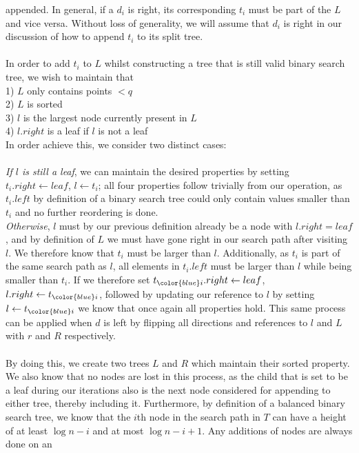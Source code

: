 \documentclass{article}
\newcommand{\fb}[1]{{\color{blue}#1}}
\begin{document}
appended. In general, if a $d_i$ is right, its corresponding $t_i$ must be part
of the $L$ and vice versa. Without loss of generality, we will assume that
$d_i$ is right in our discussion of how to append $t_i$ to its split tree. \\\\
In order to add $t_i$ to $L$ whilst constructing a tree that is still valid
binary search tree, we wish to maintain that \\ 1) $L$ only contains points $<
    q$ \\ 2) $L$ is sorted \\ 3) $l$ is the largest node currently present in $L$
\\ 4) $l.right$ is a leaf if $l$ is not a leaf \\ In order achieve this, we
consider two distinct cases: \\\\ \textit{If $l$ is still a leaf}, we can
maintain the desired properties by setting $t_i.right \leftarrow leaf$, $l
    \leftarrow t_i$; all four properties follow trivially from our operation, as
$t_i.left$ by definition of a binary search tree could only contain values
smaller than $t_i$ and no further reordering is done. \\ \textit{Otherwise},
$l$ must by our previous definition already be a node with $l.right = leaf$,
and by definition of $L$ we must have gone right in our search path after
visiting $l$. We therefore know that $t_i$ must be larger than $l$.
Additionally, as $t_i$ is part of the same search path as $l$, all elements in
$t_i.left$ must be larger than $l$ while being smaller than $t_i$. If we
therefore set $t_{\fb{i}}.right \leftarrow leaf$, $l.right \leftarrow t_{\fb{i}}$, followed by
updating our reference to $l$ by setting $l \leftarrow t_{\fb{i}}$ we know that once
again all properties hold. This same process can be applied when $d$ is left by
flipping all directions and references to $l$ and $L$ with $r$ and $R$
respectively. \\\\ By doing this, we create two trees $L$ and $R$ which
maintain their sorted property. We also know that no nodes are lost in this
process, as the child that is set to be a leaf during our iterations also is
the next node considered for appending to either tree, thereby including it.
Furthermore, by definition of a balanced binary search tree, we know that the
$i$th node in the search path in $T$ can have a height of at least $\log n - i$
and at most $\log n - i + 1$. Any additions of nodes are always done on an
\end{document}
